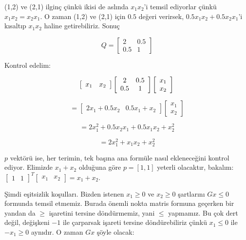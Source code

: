 \documentclass[12pt,fleqn]{article}\usepackage{../../common}
\begin{document}
(1,2) ve (2,1) ilginç çünkü ikisi de aslında $x_1x_2$'i temsil
ediyorlar çünkü $x_1x_2 = x_2x_1$. O zaman (1,2) ve (2,1) için $0.5$
değeri verirsek, $0.5x_1x_2 + 0.5x_2x_1$'i kısaltıp $x_1x_2$ haline
getirebiliriz. Sonuç

$$ 
Q = \left[ \begin{array}{cc}
2 & 0.5 \\ 0.5 & 1
\end{array} \right]
$$

Kontrol edelim:

$$ 
\left[ \begin{array}{cc}
 x_1 & x_2 
\end{array} \right]
\left[ \begin{array}{cc}
2 & 0.5 \\ 0.5 & 1
\end{array} \right]
\left[ \begin{array}{c}
x_1 \\  x_2 
\end{array} \right] \\
$$

$$ 
= \left[ 
\begin{array}{cc}
2x_1 + 0.5x_2 & 0.5x_1 + x_2 
\end{array} 
\right]
\left[ 
\begin{array}{c}
x_1 \\ x_2 
\end{array} 
\right] 
$$

$$ = 2x_1^2 + 0.5x_2x_1 + 0.5x_1x_2 + x_2^2  $$

$$ = 2x_1^2 + x_1x_2 + x_2^2  $$

$p$ vektörü ise, her terimin, tek başına ana formüle nasıl ekleneceğini kontrol
ediyor. Elimizde $x_1 + x_2$ olduğuna göre $p = [1, 1]$ yeterli olacaktır,
bakalım: $\left[\begin{array}{cc}1&1\end{array}\right]^T
\left[\begin{array}{cc}x_1&x_2\end{array}\right] = x_1 + x_2$.
 
Şimdi eşitsizlik koşulları. Bizden istenen $x_1 \geq 0$ ve $x_2 \geq 0$
şartlarını $Gx \leq 0$ formunda temsil etmemiz. Burada önemli nokta matris
formuna geçerken bir yandan da $\geq$ işaretini tersine döndürmemiz, yani $\leq$
yapmamız. Bu çok dert değil, değişkeni $-1$ ile çarparsak işareti tersine
döndürebiliriz çünkü $x_1 \leq 0$ ile $-x_1 \geq 0$ aynıdır. O zaman $Gx$ şöyle
olacak:
\end{document}
